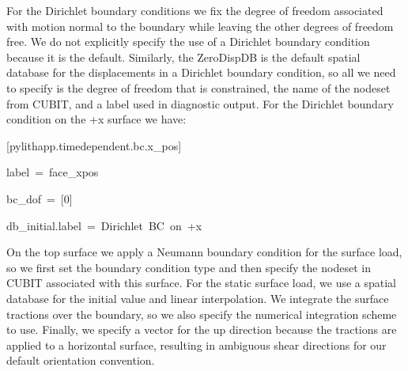 For the Dirichlet boundary conditions we fix the degree of freedom
associated with motion normal to the boundary while leaving the other
degrees of freedom free. We do not explicitly specify the use of a
Dirichlet boundary condition because it is the default. Similarly,
the ZeroDispDB is the default spatial database for the displacements
in a Dirichlet boundary condition, so all we need to specify is the
degree of freedom that is constrained, the name of the nodeset from
CUBIT, and a label used in diagnostic output. For the Dirichlet boundary
condition on the +x surface we have:
\begin{lyxcode}
{[}pylithapp.timedependent.bc.x\_pos{]}

label~=~face\_xpos

bc\_dof~=~{[}0{]}

db\_initial.label~=~Dirichlet~BC~on~+x
\end{lyxcode}
On the top surface we apply a Neumann boundary condition for the surface
load, so we first set the boundary condition type and then specify
the nodeset in CUBIT associated with this surface. For the static
surface load, we use a spatial database for the initial value and
linear interpolation. We integrate the surface tractions over the
boundary, so we also specify the numerical integration scheme to use.
Finally, we specify a vector for the up direction because the tractions
are applied to a horizontal surface, resulting in ambiguous shear
directions for our default orientation convention.
